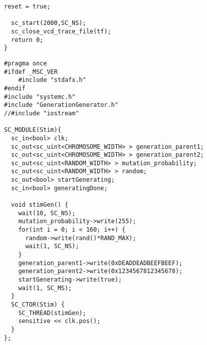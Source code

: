 \begin{lstlisting}[style=customc++,caption={Testbench for GenerationGenerator},label={lst:generatorTestbench}]
  reset = true;

  sc_start(2000,SC_NS);
  sc_close_vcd_trace_file(tf);
  return 0;
}
\end{lstlisting}


\begin{lstlisting}[style=customc++,caption={Stimulation for Generationgenerator},label={lst:generationGeneratiorStim}]
#pragma once
#ifdef _MSC_VER
	#include "stdafx.h"
#endif
#include "systemc.h"
#include "GenerationGenerator.h"
//#include "iostream"

SC_MODULE(Stim){
  sc_in<bool> clk;
  sc_out<sc_uint<CHROMOSOME_WIDTH> > generation_parent1;
  sc_out<sc_uint<CHROMOSOME_WIDTH> > generation_parent2;
  sc_out<sc_uint<RANDOM_WIDTH> > mutation_probability;
  sc_out<sc_uint<RANDOM_WIDTH> > random;
  sc_out<bool> startGenerating;
  sc_in<bool> generatingDone;

  void stimGen() {
    wait(10, SC_NS);
    mutation_probability->write(255);
    for(int i = 0; i < 160; i++) {
      random->write(rand()*RAND_MAX);
      wait(1, SC_NS);
    }
    generation_parent1->write(0xDEADDEADBEEFBEEF);
    generation_parent2->write(0x1234567812345678);
    startGenerating->write(true);
    wait(1, SC_MS);
  }
  SC_CTOR(Stim) {
    SC_THREAD(stimGen);
    sensitive << clk.pos();
  }
};
\end{lstlisting}

